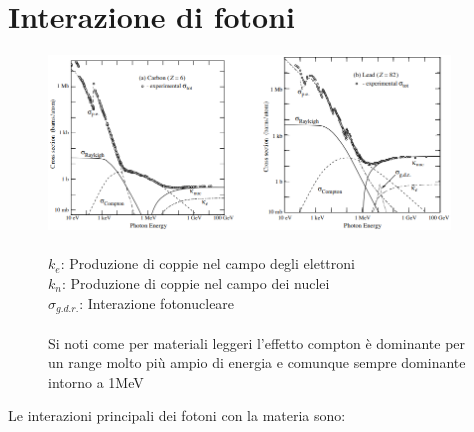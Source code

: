 \section{Interazione di fotoni}
\begin{figure}[H]
    \centering
    \includegraphics[width=0.95\textwidth,frame]{Chapters/images/Interazione_radiazione_materia/image-20220220114414907.png}
    \captionsetup{width=0.95\linewidth}
    \caption{\\ $k_e$: Produzione di coppie nel campo degli elettroni\\$k_n$: Produzione di coppie nel campo dei nuclei\\$\sigma_{g.d.r.}$: Interazione fotonucleare\\ \\Si noti come per materiali leggeri l'effetto compton è dominante per un range molto più ampio di energia e comunque sempre dominante intorno a 1MeV}
    \label{fig:}
\end{figure}
Le interazioni principali dei fotoni con la materia sono:
